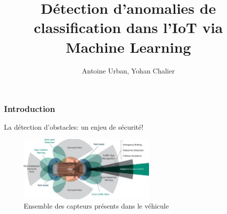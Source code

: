 \documentclass{beamer}
\title{Détection d'anomalies de classification dans l'IoT via Machine Learning}
\author{Antoine Urban, Yohan Chalier}
\institute{Projet de filière SR2I \\ Télécom ParisTech}
\begin{document}
\begin{frame}
\titlepage
\end{frame}

\begin{frame}
  \frametitle{Introduction}
La détection d'obstacles: un enjeu de sécurité! \\
\bigskip
\begin{figure}[b]
\centering
\includegraphics[width=0.6\textwidth]{img/sensors.png}
\caption{Ensemble des capteurs présents dans le véhicule\label{sensors}}
\end{figure}


\end{frame}
\end{document}
